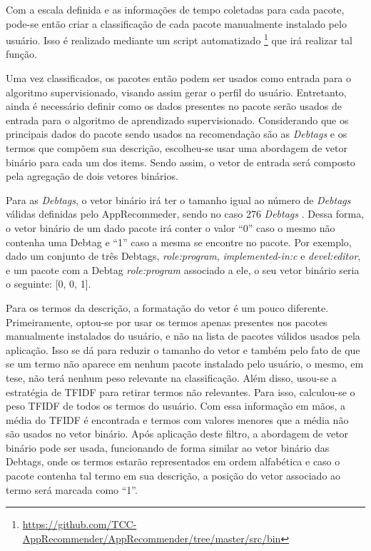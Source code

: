 Com a escala definida e as informações de tempo coletadas para cada pacote,
pode-se então criar a classificação de cada pacote manualmente instalado pelo
usuário.
Isso é realizado mediante um script automatizado \footnote{\url{https://github.com/TCC-AppRecommender/AppRecommender/tree/master/src/bin}}
que irá realizar tal função.

Uma vez classificados, os pacotes então podem ser usados como entrada para o
algoritmo supervisionado, visando assim gerar o perfil do usuário.
Entretanto, ainda é necessário definir como os dados presentes no pacote serão usados de entrada para o
algoritmo de aprendizado supervisionado. Considerando que os principais dados do pacote sendo usados na
recomendação são as \textit{Debtags} e os termos que compõem sua descrição, escolheu-se usar uma abordagem de
vetor binário para cada um dos items. Sendo assim, o vetor de entrada será composto pela agregação de dois vetores
binários.

Para as \textit{Debtags}, o vetor binário irá ter o tamanho igual ao número de
\textit{Debtags} válidas definidas pelo AppRecommeder, sendo no caso 276
\textit{Debtags} \cite{araujo2011apprecommender}. Dessa forma,
o vetor binário de um dado pacote irá conter o valor ``0'' caso o mesmo não
contenha uma Debtag e ``1'' caso a mesma se encontre
no pacote. Por exemplo, dado um conjunto de três Debtags, \textit{role:program},
\textit{implemented-in:c} e \textit{devel:editor}, e um pacote com a Debtag
\textit{role:program} associado a ele, o seu vetor binário seria o seguinte: [0, 0, 1].

Para os termos da descrição, a formatação do vetor é um pouco diferente. Primeiramente, optou-se por usar os termos apenas presentes
nos pacotes manualmente instalados do usuário, e não na lista de pacotes válidos
usados pela aplicação. Isso se dá para reduzir o tamanho do vetor e também
pelo fato de que se um termo não aparece em nenhum pacote instalado pelo
usuário, o mesmo, em tese, não terá nenhum peso relevante na
classificação. Além disso, usou-se a estratégia de TFIDF para retirar termos não
relevantes. Para isso, calculou-se o peso TFIDF de todos os termos do usuário.
Com essa informação em mãos, a média do TFIDF é encontrada e termos com valores menores que a
média não são usados no vetor binário. Após aplicação deste filtro, a abordagem de vetor binário pode ser usada, funcionando de forma
similar ao vetor binário das Debtags, onde os termos estarão representados em ordem alfabética e caso o pacote contenha tal termo em sua
descrição, a posição do vetor associado ao termo será marcada como ``1''.

